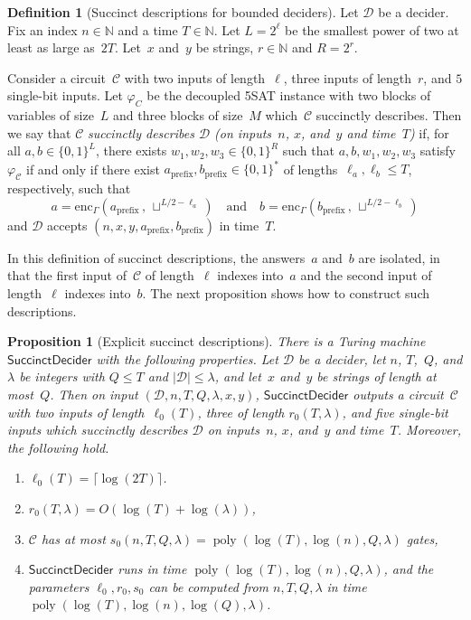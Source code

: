 \documentclass[11pt]{article}
\newtheorem{proposition}[theorem]{Proposition}
\theoremstyle{definition}
\newtheorem{definition}[theorem]{Definition}
\newcommand{\N}{\ensuremath{\mathbb{N}}}
\DeclareMathOperator{\poly}{poly}
\newcommand{\decider}{\mathcal{D}}
\newcommand{\succinctdecider}{\ensuremath{\mathsf{SuccinctDecider}}}
\newcommand{\circuit}{\mathcal{C}}
\newcommand{\qlen}{Q}
\begin{document}
\begin{definition}[Succinct descriptions for bounded deciders]
  Let $\decider$ be a decider.
  Fix an index $n \in \N$ and a time $T \in \N$.
  Let $L = 2^\ell$ be the smallest power of two at least as large as~$2T$.
  Let~$x$ and~$y$ be strings, $r\in\N$ and $R=2^r$.

  Consider a circuit~$\circuit$ with two inputs of length~$\ell$, three inputs
  of length~$r$, and $5$ single-bit inputs.
  Let $\varphi_C$ be the decoupled 5SAT instance with two blocks of variables of
  size~$L$ and three blocks of size~$M$ which~$\circuit$ succinctly describes.
  Then we say that $\circuit$ \emph{succinctly describes $\decider$ (on
    inputs~$n$, $x$, and~$y$ and time~$T$)} if, for all $a, b \in \{0, 1\}^{L}$,
  there exists $w_1, w_2, w_3 \in \{0, 1\}^{R}$ such that $a, b, w_1, w_2, w_3$
  satisfy $\varphi_{\circuit}$ if and only if there exist $a_{\mathrm{prefix}},
  b_{\mathrm{prefix}} \in \{0, 1\}^*$ of lengths~$\ell_a, \ell_b \leq T$,
  respectively, such that
  \begin{equation*}
    a = \mathrm{enc}_\Gamma(a_{\mathrm{prefix}}\,,\, \sqcup^{L/2 - \ell_a})
  \quad
  \text{and}
  \quad
  b = \mathrm{enc}_\Gamma(b_{\mathrm{prefix}}\,,\, \sqcup^{L/2 - \ell_b})
  \end{equation*}
  and $\decider$ accepts $(n, x, y, a_{\mathrm{prefix}}, b_{\mathrm{prefix}})$
  in time~$T$.
\end{definition}

In this definition of succinct descriptions, the answers~$a$ and~$b$ are
isolated, in that the first input of~$\circuit$ of length~$\ell$ indexes
into~$a$ and the second input of length~$\ell$ indexes into~$b$.
The next proposition shows how to construct such descriptions.

\begin{proposition}[Explicit succinct descriptions]
  \label{prop:explicit-succinct-deciders}
  There is a Turing machine $\succinctdecider$ with the following properties.
  Let $\decider$ be a decider, let $n$, $T$,~$\qlen$, and $\lambda$ be integers
  with $\qlen \leq T$ and $|\decider| \leq \lambda$, and let~$x$ and~$y$ be
  strings of length at most~$\qlen$.
  Then on input $(\decider, n, T, \qlen, \lambda, x, y)$, $\succinctdecider$
  outputs a circuit~$\circuit$ with two inputs of length~$\ell_0(T)$, three of
  length $r_0(T, \lambda)$, and five single-bit inputs which succinctly
  describes $\decider$ on inputs~$n$, $x$, and~$y$ and time~$T$.
  Moreover, the following hold.
  \begin{enumerate}
  \item $\ell_0(T) = \lceil \log(2T) \rceil$.
  \item $r_0(T,\lambda) = O(\log(T)+\log(\lambda))$,
  \item $\circuit$ has at most $s_0(n,T,\qlen,\lambda) = \poly(\log(T), \log(n),
    \qlen,\lambda)$ gates,
  \item $\succinctdecider$ runs in time $\poly(\log(T), \log(n),
    \qlen,\lambda)$, and the parameters $\ell_0, r_0, s_0$ can be computed
    from $n, T, \qlen,\lambda$ in time $\poly(\log(T), \log(n),
    \log(\qlen),\lambda)$.
  \end{enumerate}
\end{proposition}
\end{document}
